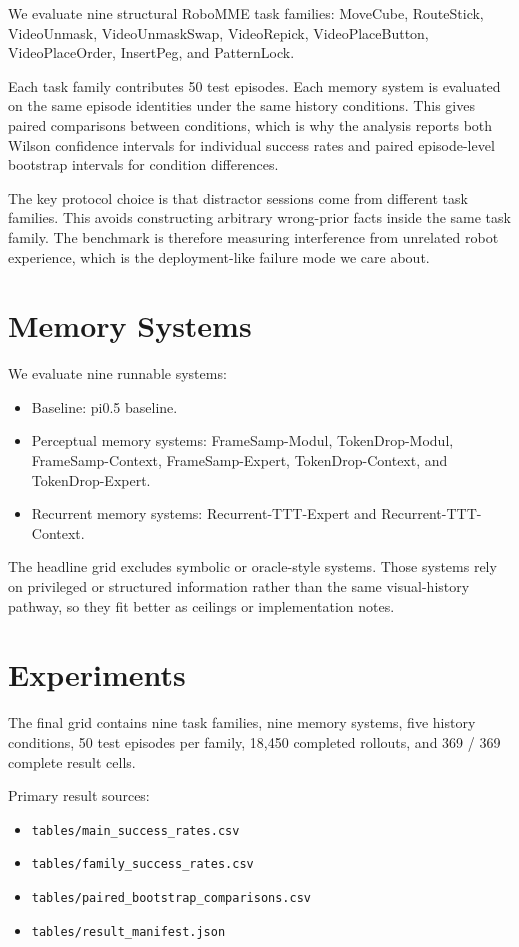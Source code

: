 \documentclass[10pt,letterpaper]{article}
\begin{document}
We evaluate nine structural RoboMME task families: MoveCube, RouteStick, VideoUnmask, VideoUnmaskSwap, VideoRepick, VideoPlaceButton, VideoPlaceOrder, InsertPeg, and PatternLock.

Each task family contributes 50 test episodes. Each memory system is evaluated on the same episode identities under the same history conditions. This gives paired comparisons between conditions, which is why the analysis reports both Wilson confidence intervals for individual success rates and paired episode-level bootstrap intervals for condition differences.

The key protocol choice is that distractor sessions come from different task families. This avoids constructing arbitrary wrong-prior facts inside the same task family. The benchmark is therefore measuring interference from unrelated robot experience, which is the deployment-like failure mode we care about.

\section{Memory Systems}

We evaluate nine runnable systems:
\begin{itemize}
  \item Baseline: pi0.5 baseline.
  \item Perceptual memory systems: FrameSamp-Modul, TokenDrop-Modul, FrameSamp-Context, FrameSamp-Expert, TokenDrop-Context, and TokenDrop-Expert.
  \item Recurrent memory systems: Recurrent-TTT-Expert and Recurrent-TTT-Context.
\end{itemize}

The headline grid excludes symbolic or oracle-style systems. Those systems rely on privileged or structured information rather than the same visual-history pathway, so they fit better as ceilings or implementation notes.

\section{Experiments}

The final grid contains nine task families, nine memory systems, five history conditions, 50 test episodes per family, 18,450 completed rollouts, and 369 / 369 complete result cells.

Primary result sources:
\begin{itemize}
  \item \texttt{tables/main\_success\_rates.csv}
  \item \texttt{tables/family\_success\_rates.csv}
  \item \texttt{tables/paired\_bootstrap\_comparisons.csv}
  \item \texttt{tables/result\_manifest.json}
\end{itemize}
\end{document}
